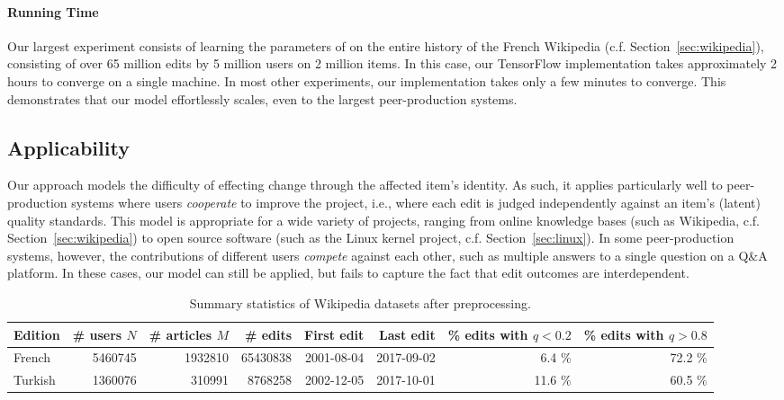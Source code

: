 \documentclass[format=sigconf]{acmart}
\newcommand{\interank}[1]{%
\ifthenelse{\isempty{#1}}{\textsc{interank}}{\textsc{interank} \emph{#1}}}
\begin{document}
\paragraph{Running Time}
Our largest experiment consists of learning the parameters of \interank{full} on the entire history of the French Wikipedia (c.f. Section~\ref{sec:wikipedia}), consisting of over \num{65} million edits by \num{5} million users on \num{2} million items.
In this case, our TensorFlow implementation takes approximately \num{2} hours to converge on a single machine.
In most other experiments, our implementation takes only a few minutes to converge.
This demonstrates that our model effortlessly scales, even to the largest peer-production systems.

\subsection{Applicability}
Our approach models the difficulty of effecting change through the affected item's identity.
As such, it applies particularly well to peer-production systems where users \emph{cooperate} to improve the project, i.e., where each edit is judged independently against an item's (latent) quality standards.
This model is appropriate for a wide variety of projects, ranging from online knowledge bases (such as Wikipedia, c.f. Section~\ref{sec:wikipedia}) to open source software (such as the Linux kernel project, c.f. Section~\ref{sec:linux}).
In some peer-production systems, however, the contributions of different users \emph{compete} against each other, such as multiple answers to a single question on a Q\&A platform.
In these cases, our model can still be applied, but fails to capture the fact that edit outcomes are interdependent.
\begin{table*}
  \caption{Summary statistics of Wikipedia datasets after preprocessing.}
  \label{tab:wikidata}
  \begin{tabular}{lrrrrrrr}
    \toprule
    Edition &  \# users $N$ & \# articles $M$ &       \# edits & First edit &  Last edit & \% edits with $q < 0.2$ & \% edits with $q > 0.8$ \\
    \midrule
    French  & \num{5460745} &   \num{1932810} & \num{65430838} & 2001-08-04 & 2017-09-02 &            \num{6.4} \% &           \num{72.2} \% \\
    Turkish & \num{1360076} &    \num{310991} &  \num{8768258} & 2002-12-05 & 2017-10-01 &           \num{11.6} \% &           \num{60.5} \% \\
    \bottomrule
  \end{tabular}
\end{table*}
\end{document}
